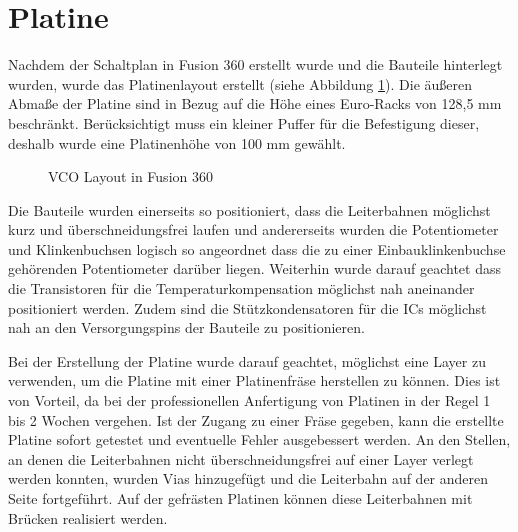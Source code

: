 \newpage

\section{Platine}
Nachdem der Schaltplan in Fusion 360 erstellt wurde und die Bauteile hinterlegt wurden, wurde das Platinenlayout erstellt (siehe Abbildung \ref{fig:VCO Layout}).
Die äußeren Abmaße der Platine sind in Bezug auf die Höhe eines Euro-Racks von 128,5 mm beschränkt. 
Berücksichtigt muss ein kleiner Puffer für die Befestigung dieser, deshalb wurde eine Platinenhöhe von 100 mm gewählt.

\begin{figure}[h]
	\centering
	\setlength{\fboxsep}{1pt} %
	\setlength{\fboxrule}{1pt} %
	\caption{VCO Layout in Fusion 360}
	\label{fig:VCO Layout}
\end{figure}

Die Bauteile wurden einerseits so positioniert, dass die Leiterbahnen möglichst kurz und überschneidungsfrei laufen und andererseits wurden die Potentiometer und Klinkenbuchsen logisch so angeordnet dass die zu einer Einbauklinkenbuchse gehörenden Potentiometer darüber liegen.
Weiterhin wurde darauf geachtet dass die Transistoren für die Temperaturkompensation möglichst nah aneinander positioniert werden.
Zudem sind die Stützkondensatoren für die ICs möglichst nah an den Versorgungspins der Bauteile zu positionieren.

Bei der Erstellung der Platine wurde darauf geachtet, möglichst eine Layer zu verwenden, um die Platine mit einer Platinenfräse herstellen zu können.
Dies ist von Vorteil, da bei der professionellen Anfertigung von Platinen in der Regel 1 bis 2 Wochen vergehen.
Ist der Zugang zu einer Fräse gegeben, kann die erstellte Platine sofort getestet und eventuelle Fehler ausgebessert werden.
An den Stellen, an denen die Leiterbahnen nicht überschneidungsfrei auf einer Layer verlegt werden konnten, wurden Vias hinzugefügt und die Leiterbahn auf der anderen Seite fortgeführt.
Auf der gefrästen Platinen können diese Leiterbahnen mit Brücken realisiert werden.

